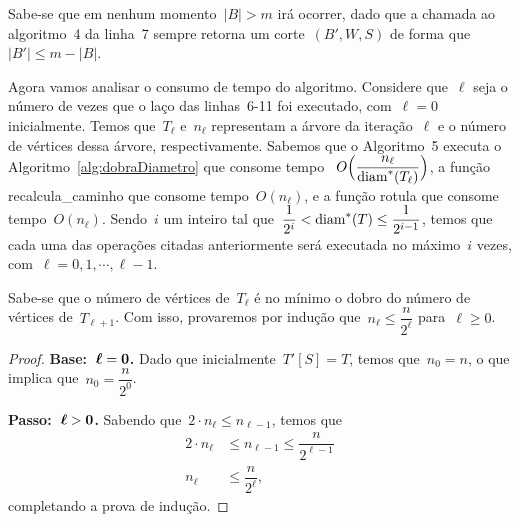 		Sabe-se que em nenhum momento~$|B|>m$ irá ocorrer, dado que a chamada ao algoritmo~4
		da linha~7 sempre retorna um corte~$(B',W,S)$ de forma que~$|B'|\le m-|B|$.


		\bigskip

		Agora vamos analisar o consumo de tempo do algoritmo.
		Considere que~$\ell$ seja o número de vezes que o laço
		das linhas~6-11 foi executado, com~$\ell = 0$ inicialmente.
		Temos que~$T_\ell$ e~$n_\ell$ 
		representam a árvore da iteração~$\ell$ e
		o número de vértices dessa árvore, respectivamente.
		Sabemos que o Algoritmo~5 
		executa
		o Algoritmo~\ref{alg:dobraDiametro} que consome 
		tempo ~${O\Big(\dfrac{n_\ell}{\mathrm{diam}^*(T_\ell)}\Big)}$, a função
		{\sc recalcula\_caminho} que consome tempo~$O(n_\ell)$, e a função
		{\sc rotula} que consome tempo~$O(n_\ell)$.
		Sendo~$i$ um inteiro tal que~${\dfrac{1}{2^i}< \mathrm{diam}^*(T)\le \dfrac{1}{2^{i-1}}}$, 
		temos que cada uma das operações citadas anteriormente
		será executada no máximo~$i$ vezes, com~$\ell =  0,1,\cdots, \ell-1$.

		Sabe-se que o número de vértices de~$T_{\ell}$
		é no mínimo o 
		dobro do número de vértices de~$T_{\ell+1}$.
		Com isso, provaremos por indução que~$n_\ell\le \dfrac{n}{2^{\ell}}$
		para~$\ell\ge 0$.
		\begin{proof}
		\textbf{Base:~${\mathbf {\boldsymbol\ell = 0}}$.} Dado que inicialmente~${T'[S] = T}$,
		temos que~$n_0 = n$, o que implica que~$n_0 = \dfrac{n}{2^0}$. 

		\textbf{Passo:~$\mathbf{\boldsymbol\ell>0}$.} Sabendo que~$2\cdot n_\ell \le n_{\ell -1}$, temos que
		\begin{align}
			2\cdot n_{\ell} &\le n_{\ell-1}\le \dfrac{n}{2^{\ell-1}} \nonumber \\
			n_{\ell} &\le \dfrac{n}{2^{\ell}}, \nonumber
		\end{align}
		completando a prova de indução.
		\end{proof}

